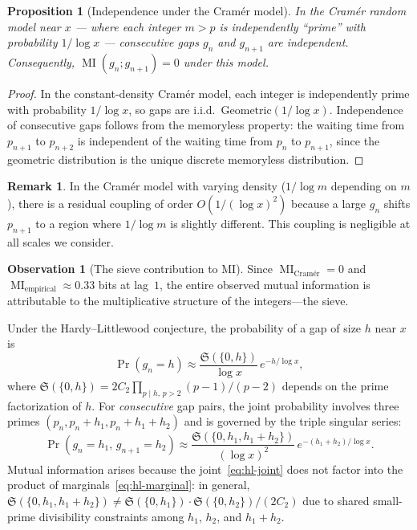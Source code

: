 \documentclass[11pt, a4paper]{amsart}
\theoremstyle{plain}
\newtheorem{proposition}[theorem]{Proposition}
\theoremstyle{definition}
\newtheorem{remark}[theorem]{Remark}
\newtheorem{observation}[theorem]{Observation}
\renewcommand{\Pr}{\operatorname{Pr}}
\newcommand{\MI}{\operatorname{MI}}
\newcommand{\fS}{\mathfrak{S}}
\begin{document}
\begin{proposition}[Independence under the Cram\'er model]
\label{prop:cramer-mi}
In the Cram\'er random model near $x$ --- where each integer $m > p$ is independently ``prime'' with probability $1/\log x$ --- consecutive gaps $g_n$ and $g_{n+1}$ are independent. Consequently, $\MI(g_n; g_{n+1}) = 0$ under this model.
\end{proposition}

\begin{proof}
In the constant-density Cram\'er model, each integer is independently prime with probability $1/\log x$, so gaps are i.i.d.\ $\mathrm{Geometric}(1/\log x)$.
Independence of consecutive gaps follows from the memoryless property: the waiting time from $p_{n+1}$ to $p_{n+2}$ is independent of the waiting time from $p_n$ to $p_{n+1}$, since the geometric distribution is the unique discrete memoryless distribution.
\end{proof}

\begin{remark}
In the Cram\'er model with varying density ($1/\log m$ depending on $m$), there is a residual coupling of order $O(1/(\log x)^2)$ because a large $g_n$ shifts $p_{n+1}$ to a region where $1/\log m$ is slightly different. This coupling is negligible at all scales we consider.
\end{remark}

\begin{observation}[The sieve contribution to MI]
\label{obs:sieve-mi}
Since $\MI_{\text{Cram\'er}} = 0$ and $\MI_{\text{empirical}} \approx 0.33$ bits at lag~$1$, the entire observed mutual information is attributable to the multiplicative structure of the integers---the sieve.

Under the Hardy--Littlewood conjecture, the probability of a gap of size $h$ near $x$ is
\begin{equation}\label{eq:hl-marginal}
\Pr(g_n = h) \approx \frac{\fS(\{0, h\})}{\log x} \, e^{-h/\log x},
\end{equation}
where $\fS(\{0, h\}) = 2C_2 \prod_{p \mid h,\, p > 2} (p-1)/(p-2)$ depends on the prime factorization of $h$.
For \emph{consecutive} gap pairs, the joint probability involves three primes $(p_n, p_n + h_1, p_n + h_1 + h_2)$ and is governed by the triple singular series:
\begin{equation}\label{eq:hl-joint}
\Pr(g_n = h_1,\, g_{n+1} = h_2) \approx \frac{\fS(\{0, h_1, h_1 + h_2\})}{(\log x)^2} \, e^{-(h_1 + h_2)/\log x}.
\end{equation}
Mutual information arises because the joint~\eqref{eq:hl-joint} does not factor into the product of marginals~\eqref{eq:hl-marginal}: in general, $\fS(\{0, h_1, h_1 + h_2\}) \ne \fS(\{0, h_1\}) \cdot \fS(\{0, h_2\}) / (2 C_2)$ due to shared small-prime divisibility constraints among $h_1$, $h_2$, and $h_1 + h_2$.
\end{observation}
\end{document}
